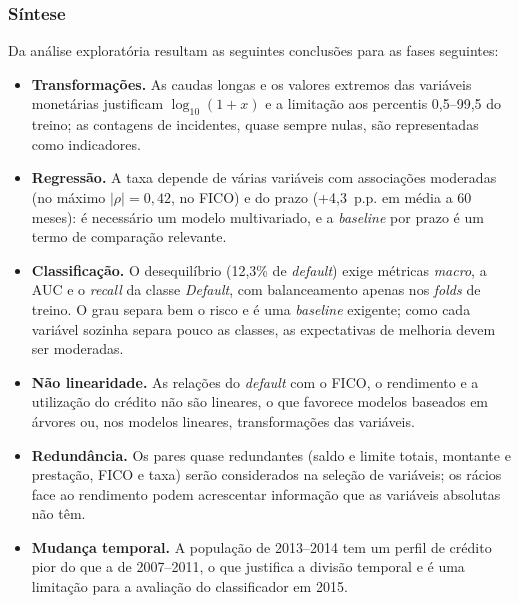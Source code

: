 \subsubsection{Síntese}

Da análise exploratória resultam as seguintes conclusões para as fases seguintes:
\begin{itemize}
  \item \textbf{Transformações.} As caudas longas e os valores extremos das variáveis monetárias justificam $\log_{10}(1+x)$ e a limitação aos percentis 0,5--99,5 do treino; as contagens de incidentes, quase sempre nulas, são representadas como indicadores.
  \item \textbf{Regressão.} A taxa depende de várias variáveis com associações moderadas (no máximo $|\rho| = 0{,}42$, no FICO) e do prazo (+4,3~p.p. em média a 60 meses): é necessário um modelo multivariado, e a \textit{baseline} por prazo é um termo de comparação relevante.
  \item \textbf{Classificação.} O desequilíbrio (12,3\% de \textit{default}) exige métricas \textit{macro}, a AUC e o \textit{recall} da classe \textit{Default}, com balanceamento apenas nos \textit{folds} de treino. O grau separa bem o risco e é uma \textit{baseline} exigente; como cada variável sozinha separa pouco as classes, as expectativas de melhoria devem ser moderadas.
  \item \textbf{Não linearidade.} As relações do \textit{default} com o FICO, o rendimento e a utilização do crédito não são lineares, o que favorece modelos baseados em árvores ou, nos modelos lineares, transformações das variáveis.
  \item \textbf{Redundância.} Os pares quase redundantes (saldo e limite totais, montante e prestação, FICO e taxa) serão considerados na seleção de variáveis; os rácios face ao rendimento podem acrescentar informação que as variáveis absolutas não têm.
  \item \textbf{Mudança temporal.} A população de 2013--2014 tem um perfil de crédito pior do que a de 2007--2011, o que justifica a divisão temporal e é uma limitação para a avaliação do classificador em 2015.
\end{itemize}

\FloatBarrier